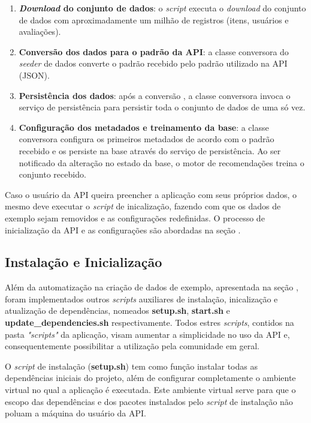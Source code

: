 \begin{enumerate}
	\item \textbf{\textit{Download} do conjunto de dados}: o \textit{script} executa o \textit{download} do conjunto de dados com aproximadamente um milhão de registros (itens, usuários e avaliações).

	\item \textbf{Conversão dos dados para o padrão da API}: a classe conversora do \textit{seeder} de dados converte o padrão recebido pelo padrão utilizado na API (JSON).

	\item \textbf{Persistência dos dados}: após a conversão , a classe conversora invoca o serviço de persistência para persistir toda o conjunto de dados de uma só vez.

	\item \textbf{Configuração dos metadados e treinamento da base}: a classe conversora configura os primeiros metadados de acordo com o padrão recebido e os persiste na base através do serviço de persistência. Ao ser notificado da alteração no estado da base, o motor de recomendações treina o conjunto recebido.
\end{enumerate}

Caso o usuário da API queira preencher a aplicação com seus próprios dados, o mesmo deve executar o \textit{script} de inicalização, fazendo com que os dados de exemplo sejam removidos e as configurações redefinidas. O processo de inicialização da API e as configurações são abordadas na seção .

\subsection{Instalação e Inicialização} \label{init}

Além da automatização na criação de dados de exemplo, apresentada na seção , foram implementados outros \textit{scripts} auxiliares de instalação, inicalização e atualização de dependências, nomeados \textbf{setup.sh}, \textbf{start.sh} e \textbf{update\_dependencies.sh} respectivamente. Todos estres \textit{scripts}, contidos na pasta \textit{"scripts"} da aplicação, visam aumentar a simplicidade no uso da API e, consequentemente possibilitar a utilização pela comunidade em geral.

O \textit{script} de instalação (\textbf{setup.sh}) tem como função instalar todas as dependências iniciais do projeto, além de configurar completamente o ambiente virtual no qual a aplicação é executada. Este ambiente virtual serve para que o escopo das dependências e dos pacotes instalados pelo \textit{script} de instalação não poluam a máquina do usuário da API.

